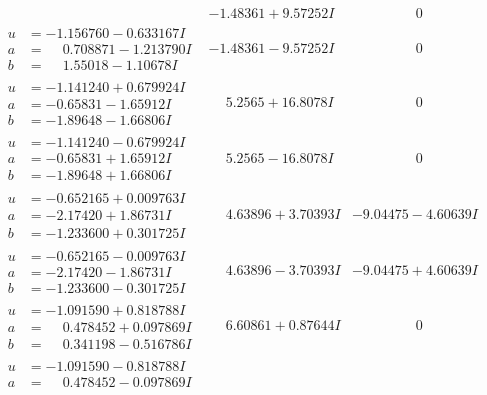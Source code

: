 \documentclass[1p]{elsarticle_modified}
\theoremstyle{definition}
\begin{document}
$$\begin{array}{c|c|c}
 & -1.48361 + 9.57252 I & \phantom{-0.000000 } 0 \\ \hline\begin{aligned}
u &= -1.156760 - 0.633167 I \\
a &= \phantom{-}0.708871 - 1.213790 I \\
b &= \phantom{-}1.55018 - 1.10678 I\end{aligned}
 & -1.48361 - 9.57252 I & \phantom{-0.000000 } 0 \\ \hline\begin{aligned}
u &= -1.141240 + 0.679924 I \\
a &= -0.65831 - 1.65912 I \\
b &= -1.89648 - 1.66806 I\end{aligned}
 & \phantom{-}5.2565 + 16.8078 I & \phantom{-0.000000 } 0 \\ \hline\begin{aligned}
u &= -1.141240 - 0.679924 I \\
a &= -0.65831 + 1.65912 I \\
b &= -1.89648 + 1.66806 I\end{aligned}
 & \phantom{-}5.2565 - 16.8078 I & \phantom{-0.000000 } 0 \\ \hline\begin{aligned}
u &= -0.652165 + 0.009763 I \\
a &= -2.17420 + 1.86731 I \\
b &= -1.233600 + 0.301725 I\end{aligned}
 & \phantom{-}4.63896 + 3.70393 I & -9.04475 - 4.60639 I \\ \hline\begin{aligned}
u &= -0.652165 - 0.009763 I \\
a &= -2.17420 - 1.86731 I \\
b &= -1.233600 - 0.301725 I\end{aligned}
 & \phantom{-}4.63896 - 3.70393 I & -9.04475 + 4.60639 I \\ \hline\begin{aligned}
u &= -1.091590 + 0.818788 I \\
a &= \phantom{-}0.478452 + 0.097869 I \\
b &= \phantom{-}0.341198 - 0.516786 I\end{aligned}
 & \phantom{-}6.60861 + 0.87644 I & \phantom{-0.000000 } 0 \\ \hline\begin{aligned}
u &= -1.091590 - 0.818788 I \\
a &= \phantom{-}0.478452 - 0.097869 I \\

\end{aligned}
\end{array}$$
\end{document}
